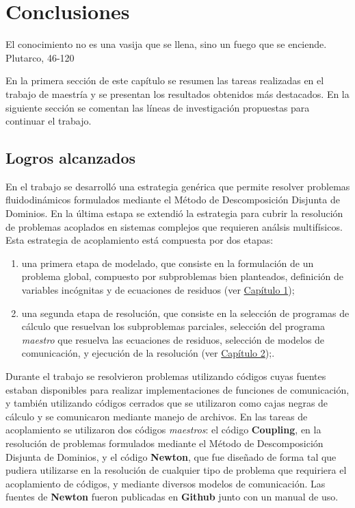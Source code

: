 \chapter{Conclusiones}
\label{conclusiones}
\chapterquote
{El conocimiento no es una vasija que se llena, sino un fuego que se enciende.}
{Plutarco, 46-120}

En la primera sección de este capítulo se resumen las tareas realizadas en el trabajo de maestría y se presentan los resultados obtenidos más destacados.
En la siguiente sección se comentan las líneas de investigación propuestas para continuar el trabajo.

\section{Logros alcanzados}
\label{logros}

En el trabajo se desarrolló una estrategia genérica que permite resolver problemas fluidodinámicos formulados mediante el Método de Descomposición Disjunta de Dominios.
En la última estapa se extendió la estrategia para cubrir la resolución de problemas acoplados en sistemas complejos que requieren análsis multifísicos.
Esta estrategia de acoplamiento está compuesta por dos etapas:
\begin{enumerate}
\item una primera etapa de modelado, que consiste en la formulación de un problema global, compuesto por subproblemas bien planteados, definición de variables incógnitas y de ecuaciones de residuos (ver \hyperlink{chapter.1}{Capítulo 1});
\item una segunda etapa de resolución, que consiste en la selección de programas de cálculo que resuelvan los subproblemas parciales,
selección del programa \textit{maestro} que resuelva las ecuaciones de residuos, selección de modelos de comunicación, y ejecución de la resolución (ver \hyperlink{chapter.2}{Capítulo 2});.
\end{enumerate}

Durante el trabajo se resolvieron problemas utilizando códigos cuyas fuentes estaban disponibles para realizar implementaciones de funciones de comunicación,
y también utilizando códigos cerrados que se utilizaron como cajas negras de cálculo y se comunicaron mediante manejo de archivos.
En las tareas de acoplamiento se utilizaron dos códigos \textit{maestros}: el código \textbf{Coupling}, en la resolución de problemas formulados mediante el Método de Descomposición Disjunta de Dominios,
y el código \textbf{Newton}, que fue diseñado de forma tal que pudiera utilizarse en la resolución de cualquier tipo de problema que requiriera el acoplamiento de códigos,
y mediante diversos modelos de comunicación.
Las fuentes de \textbf{Newton} fueron publicadas en \textbf{Github} junto con un manual de uso.

